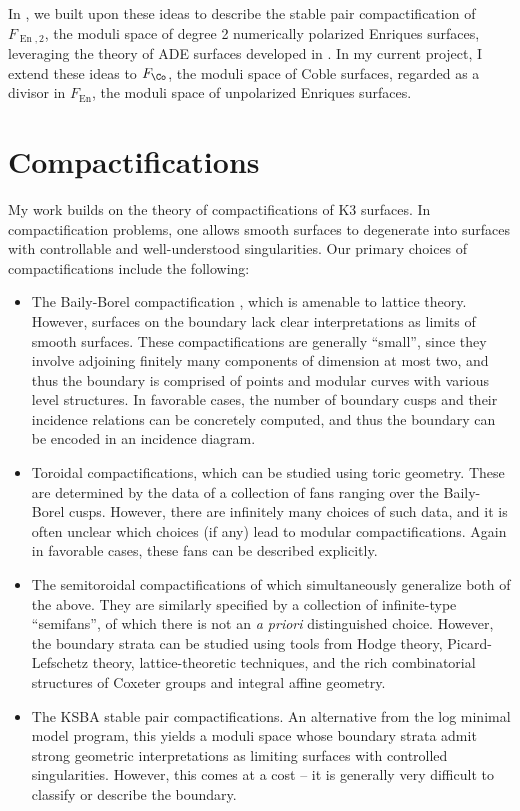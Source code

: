 \documentclass{amsart}
\begin{document}
In \cite{AEGS23}, we built upon these ideas to describe the stable pair compactification of \(F_{\operatorname{En}, 2}\), the moduli space of degree 2 numerically polarized Enriques surfaces, leveraging the theory of ADE surfaces developed in \cite{AT21}. In my current project, I extend these ideas to \(F_{\Co}\), the moduli space of Coble surfaces, regarded as a divisor in \(F_{\operatorname{En}}\), the moduli space of unpolarized Enriques surfaces.

\section{Compactifications}\label{compactifications}

My work builds on the theory of compactifications of K3 surfaces. In compactification problems, one allows smooth surfaces to degenerate into surfaces with controllable and well-understood singularities. Our primary choices of compactifications include the following:

\begin{itemize}
\item
  The Baily-Borel compactification \cite{BB66}, which is amenable to lattice theory. However, surfaces on the boundary lack clear interpretations as limits of smooth surfaces. These compactifications are generally ``small'', since they involve adjoining finitely many components of dimension at most two, and thus the boundary is comprised of points and modular curves with various level structures. In favorable cases, the number of boundary cusps and their incidence relations can be concretely computed, and thus the boundary can be encoded in an incidence diagram.
\item
  Toroidal compactifications, which can be studied using toric geometry. These are determined by the data of a collection of fans ranging over the Baily-Borel cusps. However, there are infinitely many choices of such data, and it is often unclear which choices (if any) lead to modular compactifications. Again in favorable cases, these fans can be described explicitly.
\item
  The semitoroidal compactifications of \cite{Loo03} which simultaneously generalize both of the above. They are similarly specified by a collection of infinite-type ``semifans'', of which there is not an \emph{a priori} distinguished choice. However, the boundary strata can be studied using tools from Hodge theory, Picard-Lefschetz theory, lattice-theoretic techniques, and the rich combinatorial structures of Coxeter groups and integral affine geometry.
\item
  The KSBA stable pair compactifications. An alternative from the log minimal model program, this yields a moduli space whose boundary strata admit strong geometric interpretations as limiting surfaces with controlled singularities. However, this comes at a cost -- it is generally very difficult to classify or describe the boundary.
\end{itemize}
\end{document}
